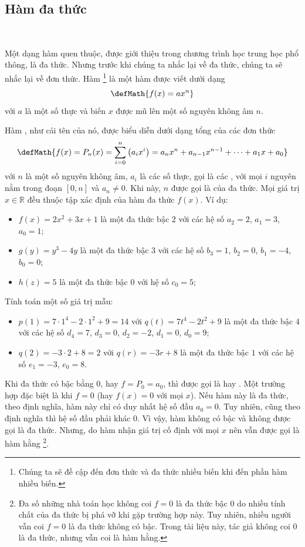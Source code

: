 \subsection{Hàm đa thức}

\ %

Một dạng hàm quen thuộc, được giới thiệu trong chương trình học trung học phổ thông, là đa thức. Nhưng trước khi chúng ta nhắc lại về đa thức, chúng ta sẽ nhắc lại về đơn thức. Hàm \footnote{Chúng ta sẽ đề cập đến đơn thức và đa thức nhiều biến khi đến phần hàm nhiều biến.} là một hàm được viết dưới dạng $$\defMath{f(x) = ax^n}$$ với $a$ là một số thực và biến $x$ được mũ lên một số nguyên không âm $n$. 

Hàm , như cái tên của nó, được biểu diễn dưới dạng tổng của các đơn thức $$\defMath{f(x)=P_n(x)=\sum_{i = 0}^n \left(a_i x^i\right) = a_nx^n + a_{n-1}x^{n-1} + \cdots + a_1x + a_0}$$ với $n$ là một số nguyên không âm, $a_i$ là các số thực, gọi là các , với mọi $i$ nguyên nằm trong đoạn $[0, n]$ và $a_n \neq 0$. Khi này, $n$ được gọi là  của đa thức\label{def:ham_so_mot_bien:da_thuc:da_thuc}. Mọi giá trị $x \in \mathbb{R}$ đều thuộc tập xác định của hàm đa thức $f(x)$. Ví dụ:
\begin{itemize}
   \item $f(x) = 2x^2 + 3x + 1$ là một đa thức bậc $2$ với các hệ số $a_2 = 2$, $a_1 = 3$, $a_0 = 1$;
   \item $g(y) = y^3 - 4y$ là một đa thức bậc $3$ với các hệ số $b_3 = 1$, $b_2 = 0$, $b_1 = -4$, $b_0 = 0$;
   \item $h(z) = 5$ là một đa thức bậc $0$ với hệ số $c_0 = 5$;
\end{itemize}
Tính toán một số giá trị mẫu:
\begin{itemize}
   \item $p(1) = 7 \cdot 1^4 - 2 \cdot 1^2 + 9 = 14$ với $q(t)= 7t^4 - 2t^2 + 9$ là một đa thức bậc $4$ với các hệ số $d_4 = 7$, $d_3 = 0$, $d_2 = -2$, $d_1 = 0$, $d_0 = 9$;
   \item $q(2) = -3 \cdot 2 + 8 = 2$ với $q(r) = -3r + 8$ là một đa thức bậc $1$ với các hệ số $e_1 = -3$, $e_0 = 8$.
\end{itemize}
Khi đa thức có bậc bằng $0$, hay $f = P_0 = a_0$, thì được gọi là  hay . Một trường hợp đặc biệt là khi $f = 0$ (hay $f(x) = 0$ với mọi $x$). Nếu hàm này là đa thức, theo định nghĩa, hàm này chỉ có duy nhất hệ số đầu $a_0 = 0$. Tuy nhiên, cũng theo định nghĩa thì hệ số đầu phải khác $0$. Vì vậy, hàm không có bậc và không được gọi là đa thức. Nhưng, do hàm nhận giá trị cố định với mọi $x$ nên vẫn được gọi là hàm hằng \footnote{Đa số những nhà toán học không coi $f = 0$ là đa thức bậc $0$ do nhiều tính chất của đa thức bị phá vỡ khi gặp trường hợp này. Tuy nhiên, nhiều người vẫn coi $f = 0$ là đa thức không có bậc. Trong tài liệu này, tác giả không coi $0$ là đa thức, nhưng vẫn coi là hàm hằng.}.

